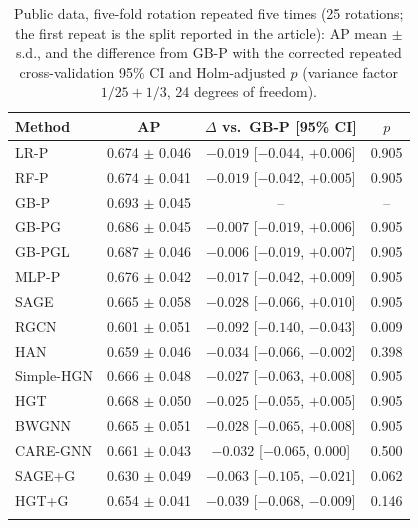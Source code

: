 \documentclass[pdflatex,sn-vancouver-num]{sn-jnl}
\begin{document}
\begin{table}[h]
\caption{Public data, five-fold rotation repeated five times (25 rotations; the first repeat is the split reported in the article): AP mean $\pm$ s.d., and the difference from GB-P with the corrected repeated cross-validation 95\% CI and Holm-adjusted $p$ (variance factor $1/25 + 1/3$, 24 degrees of freedom).}\label{tab:kaggle_repeated}
\footnotesize
\begin{tabular}{@{}lccc@{}}
\toprule
Method & AP & $\Delta$ vs.\ GB-P [95\% CI] & $p$ \\
\midrule
LR-P & 0.674 $\pm$ 0.046 & $-0.019$ [$-0.044$, $+0.006$] & 0.905 \\
RF-P & 0.674 $\pm$ 0.041 & $-0.019$ [$-0.042$, $+0.005$] & 0.905 \\
GB-P & 0.693 $\pm$ 0.045 & -- & -- \\
GB-PG & 0.686 $\pm$ 0.045 & $-0.007$ [$-0.019$, $+0.006$] & 0.905 \\
GB-PGL & 0.687 $\pm$ 0.046 & $-0.006$ [$-0.019$, $+0.007$] & 0.905 \\
MLP-P & 0.676 $\pm$ 0.042 & $-0.017$ [$-0.042$, $+0.009$] & 0.905 \\
SAGE & 0.665 $\pm$ 0.058 & $-0.028$ [$-0.066$, $+0.010$] & 0.905 \\
RGCN & 0.601 $\pm$ 0.051 & $-0.092$ [$-0.140$, $-0.043$] & 0.009 \\
HAN & 0.659 $\pm$ 0.046 & $-0.034$ [$-0.066$, $-0.002$] & 0.398 \\
Simple-HGN & 0.666 $\pm$ 0.048 & $-0.027$ [$-0.063$, $+0.008$] & 0.905 \\
HGT & 0.668 $\pm$ 0.050 & $-0.025$ [$-0.055$, $+0.005$] & 0.905 \\
BWGNN & 0.665 $\pm$ 0.051 & $-0.028$ [$-0.065$, $+0.008$] & 0.905 \\
CARE-GNN & 0.661 $\pm$ 0.043 & $-0.032$ [$-0.065$, $0.000$] & 0.500 \\
SAGE+G & 0.630 $\pm$ 0.049 & $-0.063$ [$-0.105$, $-0.021$] & 0.062 \\
HGT+G & 0.654 $\pm$ 0.041 & $-0.039$ [$-0.068$, $-0.009$] & 0.146 \\
\botrule
\end{tabular}
\end{table}
\end{document}
